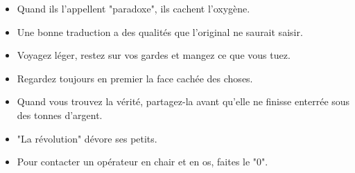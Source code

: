 \documentclass[11pt,twoside,a4paper]{book}
\begin{document}
\begin{multicols*}{2}
\begin{itemize}
		\item Quand ils l'appellent "paradoxe", ils cachent l'oxyg{\`e}ne.
		\item Une bonne traduction a des qualit{\'e}s que l'original ne saurait saisir.
		\item Voyagez l{\'e}ger, restez sur vos gardes et mangez ce que vous tuez.
		\item Regardez toujours en premier la face cach{\'e}e des choses.
		\item Quand vous trouvez la v{\'e}rit{\'e}, partagez-la avant qu'elle ne finisse enterr{\'e}e sous des tonnes d'argent.
		\item "La r{\'e}volution" d{\'e}vore ses petits.
		\item Pour contacter un op{\'e}rateur en chair et en os, faites le "0".
	\end{itemize} %
\end{multicols*}

\clearpage
\end{document}

